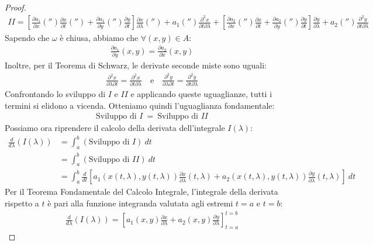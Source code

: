 \documentclass[a4paper, oneside]{article}
\begin{document}
\begin{proof}
\begin{gather*}
        \boxed{II} = \left[ \frac{\partial a_1}{\partial x}( '' ) \frac{\partial x}{\partial t}( '' )+ \frac{\partial a_1}{\partial y}( '' )\frac{\partial y}{\partial t}\right]\frac{\partial x}{\partial \lambda}( '' ) + a_1( '' ) \frac{\partial^2 x}{\partial t \partial \lambda} + \left[ \frac{\partial a_2}{\partial x}( '' )\frac{\partial x}{\partial t} + \frac{\partial a_2}{\partial y}( '' )\frac{\partial y}{\partial t} \right]\frac{\partial y}{\partial \lambda} + a_2( '' )\frac{\partial^2 y}{\partial t \partial \lambda}
    \end{gather*}
Sapendo che $\omega$ è chiusa, abbiamo che $\forall(x,y) \in A$:
    \begin{gather*}
        \frac{\partial a_1}{\partial y}(x,y) = \frac{\partial a_2}{\partial x}(x,y)
    \end{gather*}
    Inoltre, per il Teorema di Schwarz, le derivate seconde miste sono uguali:
    \begin{gather*}
        \frac{\partial^2 x}{\partial \lambda \partial t} = \frac{\partial^2 x}{\partial t \partial \lambda} \quad \text{e} \quad \frac{\partial^2 y}{\partial \lambda \partial t} = \frac{\partial^2 y}{\partial t \partial \lambda}
    \end{gather*}
    Confrontando lo sviluppo di $\boxed{I}$ e $\boxed{II}$ e applicando queste uguaglianze, tutti i termini si elidono a vicenda. Otteniamo quindi l'uguaglianza fondamentale:
    \begin{gather*}
        \text{Sviluppo di } \boxed{I} \ = \ \text{Sviluppo di } \boxed{II}
    \end{gather*}
    Possiamo ora riprendere il calcolo della derivata dell'integrale $I(\lambda)$:
    \begin{align*}
        \frac{d}{d\lambda}\left(I(\lambda)\right) &= \int_{a}^{b} \left( \text{Sviluppo di } \boxed{I} \right) \ dt \\
        &= \int_{a}^{b} \left( \text{Sviluppo di } \boxed{II} \right) \ dt \\
        &= \int_{a}^{b} \frac{d}{dt}\left[ a_1(x(t, \lambda),y(t, \lambda))\frac{\partial x}{\partial \lambda}(t, \lambda) + a_2(x(t, \lambda),y(t, \lambda))\frac{\partial y}{\partial \lambda}(t, \lambda)\right] \ dt
    \end{align*}
    Per il Teorema Fondamentale del Calcolo Integrale, l'integrale della derivata rispetto a $t$ è pari alla funzione integranda valutata agli estremi $t=a$ e $t=b$:
    \begin{gather*}
        \frac{d}{d\lambda}\left(I(\lambda)\right) = \left[ a_1(x,y)\frac{\partial x}{\partial \lambda} + a_2(x,y)\frac{\partial y}{\partial \lambda} \right]_{t=a}^{t=b}

\end{gather*}
\end{proof}
\end{document}
